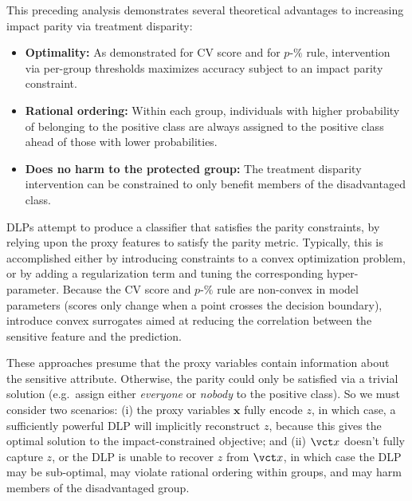 


This preceding analysis demonstrates
several theoretical advantages 
to increasing impact parity via treatment disparity:
\begin{itemize}
\item \textbf{Optimality: } 
As demonstrated for CV score and for $p$-$\%$ rule, 
intervention via per-group thresholds 
maximizes accuracy subject to an impact parity constraint.
\item \textbf{Rational ordering:} Within each group, individuals with higher probability 
of belonging to the positive class
are always assigned to the positive class 
ahead of those with lower probabilities.
\item \textbf{Does no harm to the protected group:} The treatment disparity intervention 
can be constrained to only benefit members of the disadvantaged class.
\end{itemize}

DLPs attempt to produce a classifier 
that satisfies the parity constraints,
by relying upon the proxy features 
to satisfy the parity metric. 
Typically, this is accomplished 
either by introducing constraints 
to a convex optimization problem, 
or by adding a regularization term 
and tuning the corresponding hyper-parameter. 
Because the CV score and $p$-$\%$ rule 
are non-convex in model parameters 
(scores only change 
when a point crosses the decision boundary),
\cite{kamishima2011fairness, zafar2017fairness}
introduce convex surrogates 
aimed at reducing the correlation
between the sensitive feature and the prediction.

These approaches presume that the proxy variables 
contain information about the sensitive attribute.
Otherwise, the parity could only be satisfied 
via a trivial solution 
(e.g.~assign either \emph{everyone} or \emph{nobody} 
to the positive class). 
So we must consider two scenarios: 
(i) the proxy variables $\mathbf{x}$ 
fully encode $z$,
in which case, a sufficiently powerful DLP 
will implicitly reconstruct $z$,
because this gives the optimal solution 
to the impact-constrained objective;
and (ii) $\vct x$ doesn't fully capture $z$, or the DLP is unable to recover $z$ from $\vct x$,
in which case the DLP may be sub-optimal,
may violate rational ordering within groups, 
and may harm members of the disadvantaged group.



